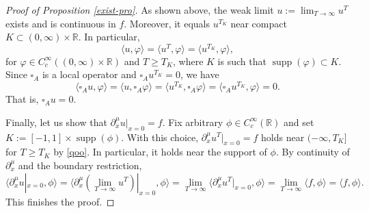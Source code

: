 \documentclass[10pt,a4paper]{article}
\theoremstyle{plain}
\theoremstyle{definition}
\theoremstyle{remark}
\numberwithin{equation}{section}
\newcommand{\R}{\mathbb{R}}
\newcommand{\supp}{\operatorname{supp}}
\begin{document}
\begin{proof}[Proof of Proposition \ref{exist-pro}]
{As shown above, the weak limit $u:= \lim_{T \to \infty} u^T $ exists and  is continuous in $f$. 
Moreover, it equals $u^{T_K}$ near compact $K \subset (0,\infty) \times \R$. In particular,
\[
\langle u ,  \varphi  \rangle  = \langle u^{T} , \varphi \rangle = \langle u^{T_K} , \varphi \rangle , 
\]
for    $\varphi \in C_c^\infty((0,\infty) \times \R)$ and $T \geq T_K$,  
where $K$ is such that $\supp(\varphi) \subset K$. 
Since $\square_A$ is a local operator and $ \square_A u^{T_K} = 0$, we have 
\[
\langle \square_A u ,  \varphi  \rangle  = \langle u , \square_A \varphi \rangle 
= \langle u^{T_K} , \square_A \varphi \rangle 
= \langle \square_A u^{T_K} , \varphi \rangle  = 0. 
\]
That is, $\square_A u =0$. 

Finally, let us show that $\partial_x^\mu u|_{x=0} = f$. Fix arbitrary $\phi \in C_c^\infty(\R)$ and 
set $K :=  [-1,1] \times \supp(\phi) $. 
With this choice, 
$\partial_x^\mu u^T |_{x= 0}  = f$ holds near $(-\infty, T_K] $ for $T \geq T_K$ by \eqref{qoo}. 
In particular, it holds near the support of $\phi$. 
By continuity of  $\partial_x^\mu$ and the boundary restriction, 
\[
\langle  \partial_x^\mu u |_{x= 0} , \phi \rangle 
= \langle  \partial_x^\mu (\lim_{T \to \infty} u^T ) |_{x= 0} , \phi \rangle 
 = \lim_{T \to \infty} \langle  \partial_x^\mu  u^T  |_{x= 0} , \phi \rangle 
  = \lim_{T \to \infty}\langle f, \phi \rangle = \langle f, \phi \rangle.
\]
This finishes the proof. 



}






\end{proof}
\end{document}

